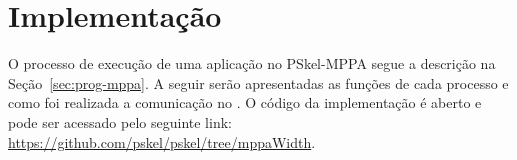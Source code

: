 %




%

\section{Implementação}
O processo de execução de uma aplicação no PSkel-MPPA segue a descrição na
Seção~\ref{sec:prog-mppa}. A seguir serão apresentadas as funções de cada
processo e como foi realizada a comunicação no \mppa. O código da implementação
é aberto e pode ser acessado pelo seguinte link: \url{https://github.com/pskel/pskel/tree/mppaWidth}.

